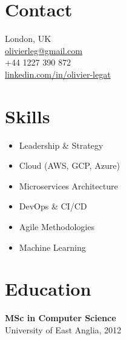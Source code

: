 \documentclass[a4paper,10pt]{article}
\begin{document}
\begin{minipage}[t]{0.32\textwidth}
    \colorbox{darkbg}{%
    \begin{minipage}[t][\textheight]{\dimexpr\textwidth-10pt}
        \raggedright
        \vspace{0.5cm} %
        
        \color{white} %
        \section*{\color{lightblue} Contact}
         London, UK \\
         \href{mailto:olivierleg@gmail.com}{olivierleg@gmail.com} \\
         +44 1227 390 872 \\
         \href{https://www.linkedin.com/in/olivier-legat}{linkedin.com/in/olivier-legat} \\
        
        \section*{\color{lightblue} Skills}
        \begin{itemize}[leftmargin=1em, nosep]
            \item Leadership \& Strategy
            \item Cloud (AWS, GCP, Azure)
            \item Microservices Architecture
            \item DevOps \& CI/CD
            \item Agile Methodologies
            \item Machine Learning
        \end{itemize}
        
        \section*{\color{lightblue} Education}
        \textbf{MSc in Computer Science} \\
        University of East Anglia, 2012
        
        \vfill %
    \end{minipage}%
    }
\end{minipage}
\end{document}
